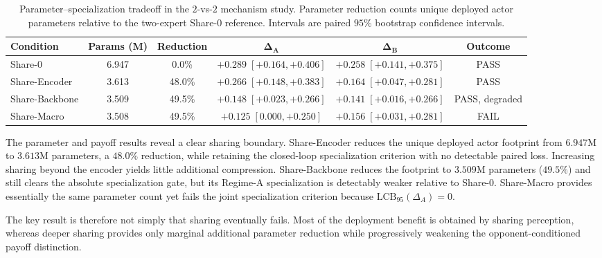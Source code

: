 \begin{table}[t]
    \centering
    \caption{Parameter--specialization tradeoff in the $2$-vs-$2$ mechanism
    study. Parameter reduction counts unique deployed actor parameters relative
    to the two-expert Share-0 reference. Intervals are paired $95\%$ bootstrap
    confidence intervals.}
    \label{tab:sharing-results}
    \scriptsize
    \setlength{\tabcolsep}{5pt}
    \begin{tabular}{lccccc}
        \toprule
        \textbf{Condition} &
        \textbf{Params (M)} &
        \textbf{Reduction} &
        $\boldsymbol{\Delta_A}$ &
        $\boldsymbol{\Delta_B}$ &
        \textbf{Outcome} \\
        \midrule
        Share-0
        & 6.947 & 0.0\%
        & $+0.289\;[+0.164,+0.406]$
        & $+0.258\;[+0.141,+0.375]$
        & PASS \\
        Share-Encoder
        & 3.613 & 48.0\%
        & $+0.266\;[+0.148,+0.383]$
        & $+0.164\;[+0.047,+0.281]$
        & PASS \\
        Share-Backbone
        & 3.509 & 49.5\%
        & $+0.148\;[+0.023,+0.266]$
        & $+0.141\;[+0.016,+0.266]$
        & PASS, degraded \\
        Share-Macro
        & 3.508 & 49.5\%
        & $+0.125\;[0.000,+0.250]$
        & $+0.156\;[+0.031,+0.281]$
        & FAIL \\
        \bottomrule
    \end{tabular}
\end{table}

The parameter and payoff results reveal a clear sharing boundary.
Share-Encoder reduces the unique deployed actor footprint from $6.947$M to
$3.613$M parameters, a $48.0\%$ reduction, while retaining the closed-loop
specialization criterion with no detectable paired loss. Increasing sharing
beyond the encoder yields little additional compression. Share-Backbone
reduces the footprint to $3.509$M parameters ($49.5\%$) and still clears the
absolute specialization gate, but its Regime-A specialization is detectably
weaker relative to Share-0. Share-Macro provides essentially the same parameter
count yet fails the joint specialization criterion because
$\mathrm{LCB}_{95}(\Delta_A)=0$.

The key result is therefore not simply that sharing eventually fails. Most of
the deployment benefit is obtained by sharing perception, whereas deeper
sharing provides only marginal additional parameter reduction while
progressively weakening the opponent-conditioned payoff distinction.

